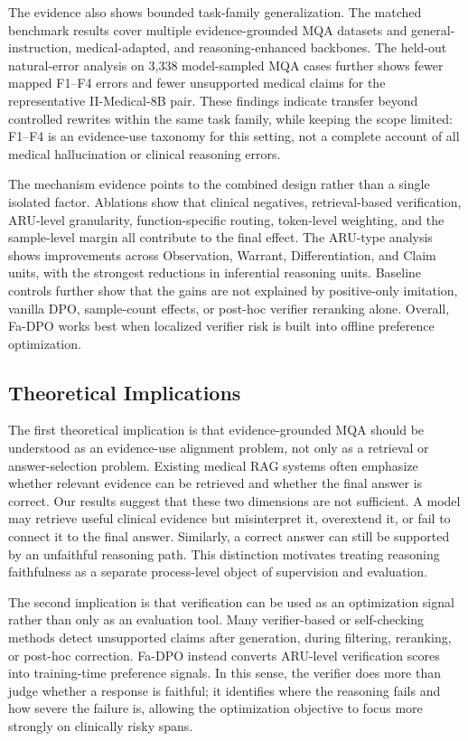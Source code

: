 \documentclass[a4paper,fleqn,doubleblind]{cas-sc}
\begin{document}
The evidence also shows bounded task-family generalization. The matched benchmark results cover multiple evidence-grounded MQA datasets and general-instruction, medical-adapted, and reasoning-enhanced backbones. The held-out natural-error analysis on 3,338 model-sampled MQA cases further shows fewer mapped F1--F4 errors and fewer unsupported medical claims for the representative II-Medical-8B pair. These findings indicate transfer beyond controlled rewrites within the same task family, while keeping the scope limited: F1--F4 is an evidence-use taxonomy for this setting, not a complete account of all medical hallucination or clinical reasoning errors.

The mechanism evidence points to the combined design rather than a single isolated factor. Ablations show that clinical negatives, retrieval-based verification, ARU-level granularity, function-specific routing, token-level weighting, and the sample-level margin all contribute to the final effect. The ARU-type analysis shows improvements across Observation, Warrant, Differentiation, and Claim units, with the strongest reductions in inferential reasoning units. Baseline controls further show that the gains are not explained by positive-only imitation, vanilla DPO, sample-count effects, or post-hoc verifier reranking alone. Overall, Fa-DPO works best when localized verifier risk is built into offline preference optimization.

\subsection{Theoretical Implications}
The first theoretical implication is that evidence-grounded MQA should be understood as an evidence-use alignment problem, not only as a retrieval or answer-selection problem. Existing medical RAG systems often emphasize whether relevant evidence can be retrieved and whether the final answer is correct. Our results suggest that these two dimensions are not sufficient. A model may retrieve useful clinical evidence but misinterpret it, overextend it, or fail to connect it to the final answer. Similarly, a correct answer can still be supported by an unfaithful reasoning path. This distinction motivates treating reasoning faithfulness as a separate process-level object of supervision and evaluation.

The second implication is that verification can be used as an optimization signal rather than only as an evaluation tool. Many verifier-based or self-checking methods detect unsupported claims after generation, during filtering, reranking, or post-hoc correction. Fa-DPO instead converts ARU-level verification scores into training-time preference signals. In this sense, the verifier does more than judge whether a response is faithful; it identifies where the reasoning fails and how severe the failure is, allowing the optimization objective to focus more strongly on clinically risky spans.
\end{document}
